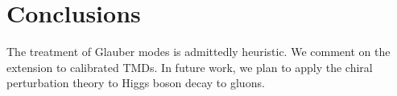 \section{Conclusions}\label{sec:conclusions}

The treatment of Glauber modes is admittedly heuristic. We comment on
the extension to calibrated TMDs. In future work, we plan to apply the
chiral perturbation theory to Higgs boson decay to gluons.

